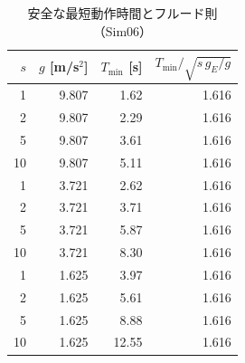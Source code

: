 \begin{longtable}{rrrr}
\caption{安全な最短動作時間とフルード則（Sim06）}\\
\toprule
$s$ & $g$ [m/s$^2$] & $T_{\min}$ [s] & $T_{\min}/\sqrt{s\,g_E/g}$ \\ \midrule \endhead
1 & 9.807 & 1.62 & 1.616 \\
2 & 9.807 & 2.29 & 1.616 \\
5 & 9.807 & 3.61 & 1.616 \\
10 & 9.807 & 5.11 & 1.616 \\
1 & 3.721 & 2.62 & 1.616 \\
2 & 3.721 & 3.71 & 1.616 \\
5 & 3.721 & 5.87 & 1.616 \\
10 & 3.721 & 8.30 & 1.616 \\
1 & 1.625 & 3.97 & 1.616 \\
2 & 1.625 & 5.61 & 1.616 \\
5 & 1.625 & 8.88 & 1.616 \\
10 & 1.625 & 12.55 & 1.616 \\
\bottomrule
\end{longtable}
